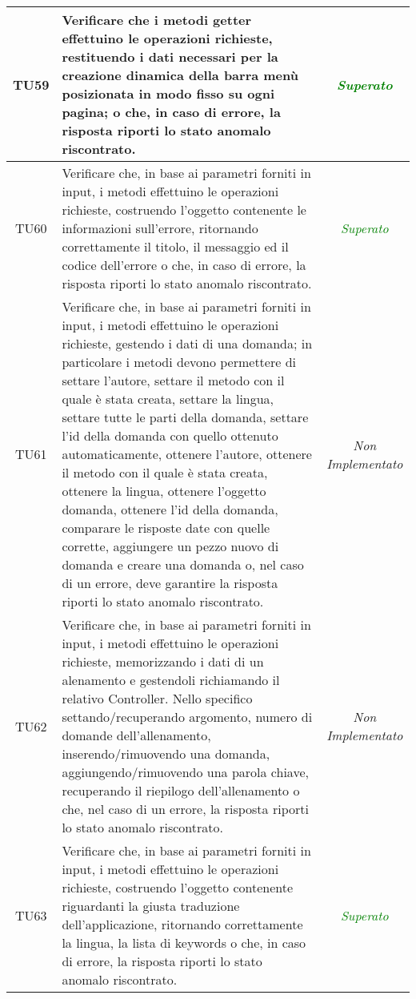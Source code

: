 \begin{longtable}{|c|>{}m{10cm}|c|}
\hypertarget{TU59}{TU59} & Verificare che i metodi getter effettuino le operazioni
richieste, restituendo i dati necessari per la creazione dinamica della barra
menù posizionata in modo fisso su ogni pagina; o che, in caso di errore, la risposta riporti lo
stato anomalo riscontrato. & \textcolor{Green}{\textit{Superato}}\\ \hline
\hypertarget{TU60}{TU60} & Verificare che, in base ai parametri forniti in input,
i metodi effettuino le operazioni richieste, costruendo l’oggetto contenente le informazioni sull'errore,
ritornando correttamente il titolo, il messaggio ed il
codice dell’errore o che, in caso di errore, la risposta
riporti lo stato anomalo riscontrato. & \textcolor{Green}{\textit{Superato}}\\ \hline
\hypertarget{TU61}{TU61} & Verificare che, in base ai parametri forniti in input, i metodi effettuino le operazioni richieste, gestendo i dati di una domanda; in particolare i metodi devono permettere di settare l'autore, settare il metodo con il quale è stata creata, settare la lingua, settare tutte le parti della domanda, settare l'id della domanda con quello ottenuto automaticamente, ottenere l'autore, ottenere il metodo con il quale è stata creata, ottenere la lingua, ottenere l'oggetto domanda, ottenere l'id della domanda, comparare le risposte date con quelle corrette, aggiungere un pezzo nuovo di domanda e creare una domanda o, nel caso di un errore, deve garantire la risposta riporti lo stato anomalo riscontrato. & \textit{Non Implementato}\\ \hline
\hypertarget{TU62}{TU62} & Verificare che, in base ai parametri forniti in input, i metodi effettuino le operazioni richieste, memorizzando i dati di un alenamento e gestendoli richiamando il relativo Controller. Nello specifico settando/recuperando argomento, numero di domande dell'allenamento, inserendo/rimuovendo una domanda, aggiungendo/rimuovendo una parola chiave, recuperando il riepilogo dell'allenamento o che, nel caso di un errore, la risposta riporti lo stato anomalo riscontrato. & \textit{Non Implementato}\\ \hline
\hypertarget{TU63}{TU63} & Verificare che, in base ai parametri forniti in input,
i metodi effettuino le operazioni richieste, costruendo l’oggetto contenente riguardanti la giusta traduzione dell’applicazione, ritornando correttamente la lingua, la lista di keywords o che, in caso di errore, la risposta riporti lo stato anomalo riscontrato. & \textcolor{Green}{\textit{Superato}}\\ \hline

\end{longtable}
